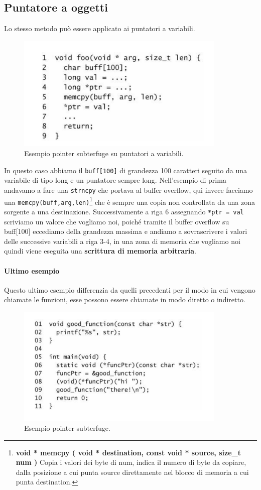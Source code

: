 \subsection{Puntatore a oggetti}
Lo stesso metodo può essere applicato ai puntatori a variabili. 
\begin{figure}[H] 
	\centering
    \includegraphics[width=10cm, keepaspectratio]{santini/img/cap_5/es_pointer_var.png}
	\caption{Esempio pointer subterfuge su puntatori a variabili.}\label{fig:es_poin_var}
\end{figure}
In questo caso abbiamo il \verb|buff[100]| di grandezza 100 caratteri seguito da una variabile di tipo long e un puntatore sempre long. Nell'esempio di prima andavamo a fare una \verb|strncpy| che portava al buffer overflow, qui invece facciamo una \verb|memcpy(buff,arg,len)|\footnote{\textbf{void * memcpy ( void * destination, const void * source, size\_t num )}  Copia i valori dei byte di num, indica il numero di byte da copiare, dalla posizione a cui punta source direttamente nel blocco di memoria a cui punta destination.} che è sempre una copia non controllata da una zona sorgente a una destinazione. Successivamente a riga 6 assegnando \verb|*ptr = val| scriviamo un valore che vogliamo noi, poiché tramite il buffer overflow su buff[100] eccediamo della grandezza massima e andiamo a sovrascrivere i valori delle successive variabili a riga 3-4, in una zona di memoria che vogliamo noi quindi viene eseguita una \textbf{scrittura di memoria arbitraria}.

\paragraph{Ultimo esempio}
Questo ultimo esempio differenzia da quelli precedenti per il modo in cui vengono chiamate le funzioni, esse possono essere chiamate in modo diretto o indiretto. 

\begin{figure}[H] 
	\centering
    \includegraphics[width=10cm, keepaspectratio]{santini/img/cap_5/ult_es_point_sub.png}
	\caption{Esempio pointer subterfuge.}\label{fig:ult_es_poin}
\end{figure}

